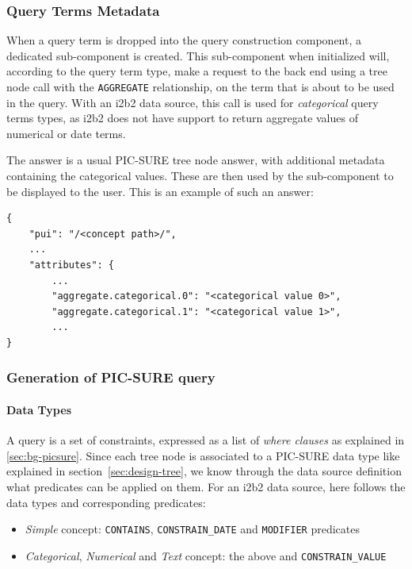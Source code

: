 \subsubsection{Query Terms Metadata}

When a query term is dropped into the query construction component, a dedicated sub-component is created.
This sub-component when initialized will, according to the query term type, make a request to the back end using a tree node call with the \verb|AGGREGATE| relationship, on the term that is about to be used in the query.
With an i2b2 data source, this call is used for \emph{categorical} query terms types, as i2b2 does not have support to return aggregate values of numerical or date terms.

The answer is a usual PIC-SURE tree node answer, with additional metadata containing the categorical values.
These are then used by the sub-component to be displayed to the user.
This is an example of such an answer:

\begin{samepage}
\begin{verbatim}
{
    "pui": "/<concept path>/",
    ...
    "attributes": {
        ...
        "aggregate.categorical.0": "<categorical value 0>",
        "aggregate.categorical.1": "<categorical value 1>",
        ...
}
\end{verbatim}
\end{samepage}


\subsubsection{Generation of PIC-SURE query}
\label{sec:gb-query}

\paragraph{Data Types}
A query is a set of constraints, expressed as a list of \emph{where clauses} as explained in \ref{sec:bg-picsure}.
Since each tree node is associated to a PIC-SURE data type like explained in section~\ref{sec:design-tree}, we know through the data source definition what predicates can be applied on them.
For an i2b2 data source, here follows the data types and corresponding predicates:
\begin{itemize}
    \setlength\itemsep{0em}

    \item \emph{Simple} concept: \verb|CONTAINS|, \verb|CONSTRAIN_DATE| and \verb|MODIFIER| predicates
    \item \emph{Categorical}, \emph{Numerical} and \emph{Text} concept: the above and \verb|CONSTRAIN_VALUE|
\end{itemize}

